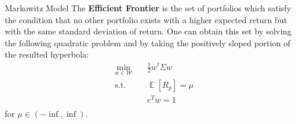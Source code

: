 \documentclass[c, 10pt]{beamer}
\begin{document}
\begin{frame}{Markowitz Model}
The \textbf{Efficient Frontier} is the set of portfolios which satisfy the condition that no other portfolio exists with a higher expected return but with the same standard deviation of return. One can obtain this set by solving the following quadratic problem and by taking the positively sloped portion of the resulted hyperbola:
    \begin{equation}
        \begin{aligned}
        \min_{w \in \mathcal{W}} \quad & \frac{1}{2}w^t \Sigma w\\
        \textrm{s.t.} \quad & \mathop{\mathbb{E}}\left[ R_p  \right] = \mu\\
        & e^T w = 1    \\
        \end{aligned}
    \end{equation}
for $\mu \in \left( -\inf, \inf \right)$.
\end{frame}
\end{document}
